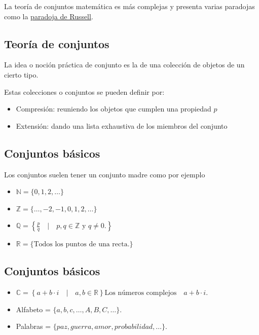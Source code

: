 \documentclass[]{book}
\providecommand{\tightlist}{%
  \setlength{\itemsep}{0pt}\setlength{\parskip}{0pt}}
\begin{document}
La teoría de conjuntos matemática es más complejas y presenta varias paradojas como la \href{https://es.wikipedia.org/wiki/Paradoja_de_Russell}{paradoja de Russell}.

\hypertarget{teoruxeda-de-conjuntos-1}{%
\subsection{Teoría de conjuntos}\label{teoruxeda-de-conjuntos-1}}

La idea o noción práctica de conjunto es la de una colección de objetos de un cierto tipo.

Estas colecciones o conjuntos se pueden definir por:

\begin{itemize}
\tightlist
\item
  Compresión: reuniendo los objetos que cumplen una propiedad \(p\)
\item
  Extensión: dando una lista exhaustiva de los miembros del conjunto
\end{itemize}

\hypertarget{conjuntos-buxe1sicos}{%
\subsection{Conjuntos básicos}\label{conjuntos-buxe1sicos}}

Los conjuntos suelen tener un conjunto madre como por ejemplo

\begin{itemize}
\tightlist
\item
  \(\mathbb{N}=\{0,1,2,\ldots\}\)
\item
  \(\mathbb{Z}=\{\ldots,-2,-1,0,1,2,\ldots\}\)
\item
  \(\mathbb{Q}=\left\{\frac{p}{q}\quad\Big|\quad p,q\in \mathbb{Z} \mbox{ y } q \not= 0.\right\}\)
\item
  \(\mathbb{R}=\{\mbox{Todos los puntos de una recta.}\}\)
\end{itemize}

\hypertarget{conjuntos-buxe1sicos-1}{%
\subsection{Conjuntos básicos}\label{conjuntos-buxe1sicos-1}}

\begin{itemize}
\tightlist
\item
  \(\mathbb{C}= \left\{a+b\cdot i\quad \big|\quad a,b\in \mathbb{R}\right\}\mbox{Los números complejos}\quad a+b\cdot i.\)
\item
  Alfabeto = \(\{a,b,c,\ldots, A,B,C,\ldots\}.\)
\item
  Palabras = \(\{paz, guerra, amor, probabilidad,\ldots\}.\)
\end{itemize}
\end{document}
